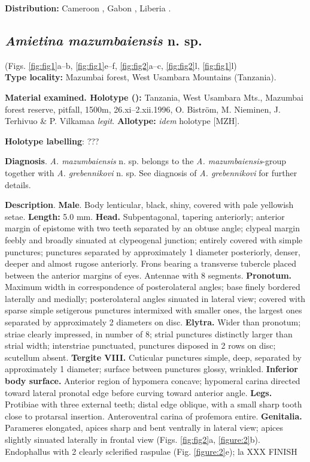 \documentclass[fleqn,10pt,lineno]{wlpeerj}
\begin{document}
\textbf{Distribution:} Cameroon \citep{cambefort1981amietina}, Gabon \citep{cambefort1991dung}, Liberia \citep{branco1988deux}.

\subsection*{\textbf{\textit{Amietina mazumbaiensis} n. sp.}}
(Figs. \ref{fig:fig1}a--b, \ref{fig:fig1}e--f, \ref{fig:fig2}a--c, \ref{fig:fig2}l, \ref{fig:fig1}l) \\

\textbf{Type locality:} Mazumbai forest, West Usambara Mountains (Tanzania).

\textbf{Material examined. Holotype (\male):} Tanzania, West Usambara Mts., Mazumbai forest reserve, pitfall, 1500m, 26.xi–2.xii.1996, O. Biström, M. Nieminen, J. Terhivuo \& P. Vilkamaa \textit{legit}. \textbf{Allotype:} \textit{idem} holotype [MZH].

\textbf{Holotype labelling}: ???

\textbf{Diagnosis}. \textit{A. mazumbaiensis} n. sp. belongs to the \textit{A. mazumbaiensis}-group together with \textit{A. grebennikovi} n. sp. See diagnosis of \textit{A. grebennikovi} for further details.

\textbf{Description}. \textbf{Male}. Body lenticular, black, shiny, covered with pale yellowish setae. \textbf{Length:} 5.0 mm. \textbf{Head.} Subpentagonal, tapering anteriorly; anterior margin of epistome with two teeth separated by an obtuse angle; clypeal margin feebly and broadly sinuated at clypeogenal junction; entirely covered with simple punctures; punctures separated by approximately 1 diameter posteriorly, denser, deeper and almost rugose anteriorly. Frons bearing a transverse tubercle placed between the anterior margins of eyes. Antennae with 8 segments. \textbf{Pronotum.} Maximum width in correspondence of posterolateral angles; base finely bordered laterally and medially; posterolateral angles sinuated in lateral view; covered with sparse simple setigerous punctures intermixed with smaller ones, the largest ones separated by approximately 2 diameters on disc. \textbf{Elytra.} Wider than pronotum; striae clearly impressed, in number of 8; strial punctures distinctly larger than strial width; interstriae punctuated, punctures disposed in 2 rows on disc; scutellum absent. \textbf{Tergite VIII.} Cuticular punctures simple, deep, separated by approximately 1 diameter; surface between punctures glossy, wrinkled. \textbf{Inferior body surface.} Anterior region of hypomera concave; hypomeral carina directed toward lateral pronotal edge before curving toward anterior angle. \textbf{Legs.} Protibiae with three external teeth; distal edge oblique, with a small sharp tooth close to protarsal insertion. Anteroventral carina of profemora entire. \textbf{Genitalia.} Parameres elongated, apices sharp and bent ventrally in lateral view; apices slightly sinuated laterally in frontal view (Figs. \ref{fig:fig2}a, \ref{figure:2}b). Endophallus with 2 clearly sclerified raspulae (Fig. \ref{figure:2}e); la
XXX FINISH
\end{document}
